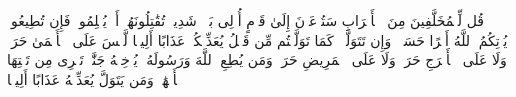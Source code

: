 \stopbuffer
\startbuffer[\q:48:16]
قُل لِّلۡمُخَلَّفِینَ مِنَ ٱلۡأَعۡرَابِ سَتُدۡعَوۡنَ إِلَىٰ قَوۡمٍ أُو۟لِی بَأۡسࣲ شَدِیدࣲ تُقَٰتِلُونَهُمۡ أَوۡ یُسۡلِمُونَۖ فَإِن تُطِیعُوا۟ یُؤۡتِكُمُ ٱللَّهُ أَجۡرًا حَسَنࣰاۖ وَإِن تَتَوَلَّوۡا۟ كَمَا تَوَلَّیۡتُم مِّن قَبۡلُ یُعَذِّبۡكُمۡ عَذَابًا أَلِیمࣰا%
\stopbuffer
\startbuffer[\q:48:17]
لَّیۡسَ عَلَى ٱلۡأَعۡمَىٰ حَرَجࣱ وَلَا عَلَى ٱلۡأَعۡرَجِ حَرَجࣱ وَلَا عَلَى ٱلۡمَرِیضِ حَرَجࣱۗ وَمَن یُطِعِ ٱللَّهَ وَرَسُولَهُۥ یُدۡخِلۡهُ جَنَّٰتࣲ تَجۡرِی مِن تَحۡتِهَا ٱلۡأَنۡهَٰرُۖ وَمَن یَتَوَلَّ یُعَذِّبۡهُ عَذَابًا أَلِیمࣰا%
\stopbuffer
